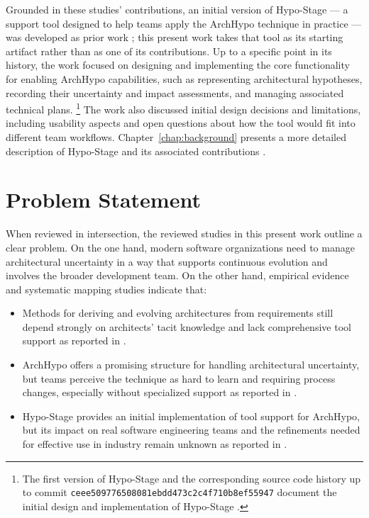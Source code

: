 Grounded in these studies' contributions, an initial version of Hypo-Stage --- a support tool designed to help teams apply the ArchHypo technique in practice --- was developed as prior work \citep{correa2025}; this present work takes that tool as its starting artifact rather than as one of its contributions.
Up to a specific point in its history, the work focused on designing and implementing the core functionality for enabling ArchHypo capabilities, such as representing architectural hypotheses, recording their uncertainty and impact assessments, and managing associated technical plans. \footnote{The first version of Hypo-Stage and the corresponding source code history up to commit \texttt{ceee509776508081ebdd473c2c4f710b8ef55947} document the initial design and implementation of Hypo-Stage \citep{correa2025}.} 
The work also discussed initial design decisions and limitations, including usability aspects and open questions about how the tool would fit into different team workflows.
Chapter~\ref{chap:background} presents a more detailed description of Hypo-Stage and its associated contributions \citep{correa2025}.

\section{Problem Statement}

When reviewed in intersection, the reviewed studies in this present work outline a clear problem. 
On the one hand, modern software organizations need to manage architectural uncertainty in a way that supports continuous evolution and involves the broader development team. 
On the other hand, empirical evidence and systematic mapping studies indicate that:

\begin{itemize}
  \item Methods for deriving and evolving architectures from requirements still depend strongly on architects' tacit knowledge and lack comprehensive tool support as reported in \citet{souza2019}.
  \item ArchHypo offers a promising structure for handling architectural uncertainty, but teams perceive the technique as hard to learn and requiring process changes, especially without specialized support as reported in \citet{silva2024tse,silva2024ieeesw}.
  \item Hypo-Stage provides an initial implementation of tool support for ArchHypo, but its impact on real software engineering teams and the refinements needed for effective use in industry remain unknown as reported in \citet{correa2025}.
\end{itemize}

